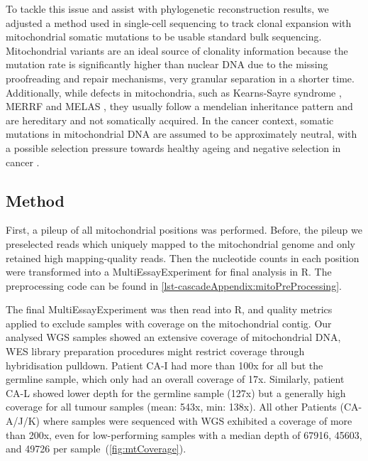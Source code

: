 To tackle this issue and assist with  phylogenetic reconstruction results, we adjusted a method used in single-cell sequencing to track clonal expansion with mitochondrial somatic mutations \cite{Ludwig2019} to be usable  standard bulk sequencing. Mitochondrial variants are an ideal source of clonality information because the mutation rate is significantly higher than nuclear DNA due to the missing proofreading and repair mechanisms,  very granular separation in a shorter time. Additionally, while defects in mitochondria, such as Kearns-Sayre syndrome \cite{Harvey1992}, MERRF \cite{Adam1993} and MELAS \cite{Hirano1992}, they usually follow a mendelian inheritance pattern and are hereditary and not somatically acquired. In the cancer context, somatic mutations in mitochondrial DNA are assumed to be approximately neutral, with a possible selection pressure towards healthy ageing and negative selection in cancer \cite{Rodell2013,Yuan2020}.

\subsection{Method}
\label{cascade-sec:mitoMethod}

First, a pileup of all mitochondrial positions was performed. Before, the pileup we preselected reads which uniquely mapped to the mitochondrial genome and only retained high mapping-quality reads. Then the nucleotide counts in each position were transformed into a MultiEssayExperiment \cite{Ramos2017} for final analysis in R. The preprocessing code can be found in \autoref{lst-cascadeAppendix:mitoPreProcessing}.

The final MultiEssayExperiment was then read into R, and quality metrics applied to exclude samples with  coverage on the mitochondrial contig. Our analysed WGS samples showed an extensive coverage of mitochondrial DNA, WES library preparation procedures might restrict coverage through hybridisation pulldown. Patient CA-I had more than 100x for all but the germline sample, which only had an overall coverage of 17x. Similarly, patient CA-L showed lower depth for the germline sample (127x) but a generally high coverage for all tumour samples (mean: 543x, min: 138x). All other Patients (CA-A/J/K) where samples were sequenced with WGS exhibited a coverage of more than 200x, even for low-performing samples with a median depth of \num{67916}, \num{45603}, and \num{49726} per sample~(\autoref{fig:mtCoverage}).

